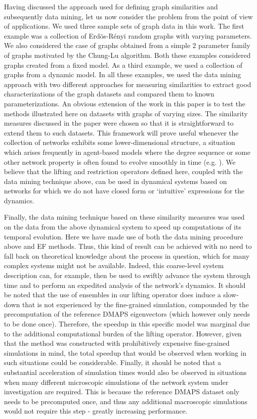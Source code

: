 Having discussed the approach used for defining graph similarities and
subsequently data mining, let us now consider the problem from the
point of view of applications.
% 
We used three sample sets of graph data in this work.
% 
The first example was a collection of Erd\"{o}s-R\'{e}nyi random
graphs with varying parameters.
% 
We also considered the case of graphs obtained from a simple $2$
parameter family of graphs motivated by the Chung-Lu algorithm.
% 
Both these examples considered graphs created from a fixed model.
% 
As a third example, we used a collection of graphs from a dynamic
model.
% 
In all these examples, we used the data mining approach with two
different approaches for measuring similarities to extract good
characterizations of the graph datasets and compared them to known
parameterizations.
% 
An obvious extension of the work in this paper is to test the methods
illustrated here on datasets with graphs of varying sizes.
% 
The similarity measures discussed in the paper were chosen so that it
is straightforward to extend them to such datasets. This framework
will prove useful whenever the collection of networks exhibits some
lower-dimensional structure, a situation which arises frequently in
agent-based models where the degree sequence or some other network
property is often found to evolve smoothly in time
(e.g. \cite{Durr12graph} \cite{holiday2016equation}
\cite{bold2014equation}). We believe that the lifting and restriction
operators defined here, coupled with the data mining technique above,
can be used in dynamical systems based on networks for which we do not
have closed form or `intuitive' expressions for the dynamics.

Finally, the data mining technique based on these similarity measures
was used on the data from the above dynamical system to speed up
computations of its temporal evolution. Here we have made use of both
the data mining procedure above and EF methods. Thus, this kind of
result can be achieved with no need to fall back on theoretical
knowledge about the process in question, which for many complex
systems might not be available. Indeed, this coarse-level system
description can, for example, then be used to swiftly advance the
system through time and to perform an expedited analysis of the
network's dynamics. It should be noted that the use of ensembles in
our lifting operator does induce a slow-down that is not experienced
by the fine-grained simulation, compounded by the precomputation of
the reference DMAPS eigenvectors (which however only needs to be done
once). Therefore, the speedup in this specific model was marginal due
to the additional computational burden of the lifting
operator. However, given that the method was constructed with
prohibitively expensive fine-grained simulations in mind, the total
speedup that would be observed when working in such situations could
be considerable. Finally, it should be noted that a substantial
acceleration of simulation times would also be observed in situations
when many different microscopic simulations of the network system
under investigation are required. This is because the reference DMAPS
dataset only needs to be precomputed once, and thus any additional
macroscopic simulations would not require this step - greatly
increasing performance. \\

